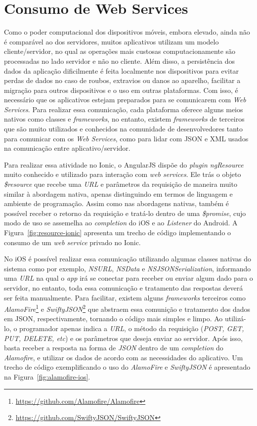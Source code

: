 \section{Consumo de Web Services} \label{subsubsec:webservices}
Como o poder computacional dos dispositivos móveis, embora elevado, ainda não é comparável ao dos servidores, muitos aplicativos utilizam um modelo cliente/servidor, no qual
as operações mais custosas computacionamente são processadas no lado servidor e não no cliente. Além disso, a persistência dos dados da aplicação dificilmente é feita localmente nos dispositivos para evitar 
perdas de dados no caso de roubos, extravios ou danos ao aparelho, facilitar a migração para outros dispositivos e o uso em outras plataformas. Com isso, é necessário que os aplicativos estejam preparados para se 
comunicarem com \textit{Web Services}. Para realizar essa comunicação, cada plataforma oferece alguns meios nativos como classes e \textit{frameworks}, no entanto, existem \textit{frameworks} de terceiros que 
são muito utilizados e conhecidos na comunidade de desenvolvedores tanto para comunicar com os \textit{Web Services}, como para lidar com JSON e XML usados na comunicação entre aplicativo/servidor. 

Para realizar essa atividade no Ionic, o AngularJS dispõe do \textit{plugin ngResource} muito conhecido e utilizado para interação com \textit{web services}. Ele trás o objeto \textit{\$resource} que recebe uma 
\textit{URL} e parâmetros da requisição de maneira muito similar à abordagem nativa, apenas distinguindo em termos de linguagem e ambiente de programação. Assim como nas abordagens nativas, também é possível receber 
o retorno da requisição e tratá-lo dentro de uma \textit{\$promise}, cujo modo de uso se assemelha ao \textit{completion} do iOS e ao \textit{Listener} do Android. A Figura~\ref{fig:resource-ionic} apresenta um trecho 
de código implementando o consumo de um \textit{web service} privado no Ionic.

No iOS é possível realizar essa comunicação utilizando algumas classes nativas do sistema como por exemplo, \textit{NSURL}, \textit{NSData} e \textit{NSJSONSerialization}, informando uma \textit{URL} 
na qual o \textit{app} irá se conectar para receber ou enviar algum dado para o servidor, no entanto, toda essa comunicação e tratamento das respostas deverá ser feita manualmente. Para facilitar, existem alguns 
\textit{frameworks} terceiros como \textit{AlamoFire}\footnote{\url{https://github.com/Alamofire/Alamofire}} e \textit{SwiftyJSON}\footnote{\url{https://github.com/SwiftyJSON/SwiftyJSON}} 
que abstraem essa comunição e tratamento dos dados em JSON, respectivamente, tornando o código mais simples e limpo. Ao utilizá-lo, o programador apenas indica a \textit{URL}, o método da requisição 
(\textit{POST, GET, PUT, DELETE, etc}) e os parâmetros que deseja enviar ao servidor. Após isso, basta receber a resposta na forma de \textit{JSON} dentro de um \textit{completion} do \textit{Alamofire}, 
e utilizar os dados de acordo com as necessidades do aplicativo. Um trecho de código exemplificando o uso do \textit{AlamoFire} e \textit{SwiftyJSON} é apresentado na Figura~\ref{fig:alamofire-ios}.

